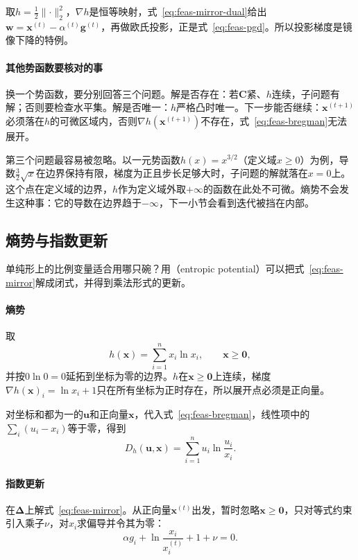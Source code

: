 取$h=\tfrac12\lVert\cdot\rVert_2^2$，$\nabla h$是恒等映射，式~\eqref{eq:feas-mirror-dual}给出$\bm{w}=\bm{x}^{(t)}-\alpha^{(t)}\bm{g}^{(t)}$，再做欧氏投影，正是式~\eqref{eq:feas-pgd}。所以投影梯度是镜像下降的特例。

\paragraph{其他势函数要核对的事}
换一个势函数，要分别回答三个问题。解是否存在：若$\bm{C}$紧、$h$连续，子问题有解；否则要检查水平集。解是否唯一：$h$严格凸时唯一。下一步能否继续：$\bm{x}^{(t+1)}$必须落在$h$的可微区域内，否则$\nabla h(\bm{x}^{(t+1)})$不存在，式~\eqref{eq:feas-bregman}无法展开。

第三个问题最容易被忽略。以一元势函数$h(x)=x^{3/2}$（定义域$x\geq0$）为例，导数$\tfrac32\sqrt{x}$在边界保持有限，梯度为正且步长足够大时，子问题的解就落在$x=0$上。这个点在定义域的边界，$h$作为定义域外取$+\infty$的函数在此处不可微。熵势不会发生这种事：它的导数在边界趋于$-\infty$，下一小节会看到迭代被挡在内部。

\subsection{熵势与指数更新}
\label{sec:feas-entropy}

单纯形上的比例变量适合用哪只碗？用（entropic potential）可以把式~\eqref{eq:feas-mirror}解成闭式，并得到乘法形式的更新。

\paragraph{熵势}
取
\begin{equation}
 h(\bm{x})=\sum_{i=1}^nx_i\ln x_i,\qquad\bm{x}\geq\bm{0},
 \label{eq:feas-entropy}
\end{equation}
并按$0\ln0=0$延拓到坐标为零的边界。$h$在$\bm{x}\geq\bm{0}$上连续，梯度$\nabla h(\bm{x})_i=\ln x_i+1$只在所有坐标为正时存在，所以展开点必须是正向量。

对坐标和都为一的$\bm{u}$和正向量$\bm{x}$，代入式~\eqref{eq:feas-bregman}，线性项中的$\sum_i(u_i-x_i)$等于零，得到
\begin{equation}
 D_h(\bm{u},\bm{x})=\sum_{i=1}^nu_i\ln\frac{u_i}{x_i}.
 \label{eq:feas-kl}
\end{equation}

\paragraph{指数更新}
在$\bm{\Delta}$上解式~\eqref{eq:feas-mirror}。从正向量$\bm{x}^{(t)}$出发，暂时忽略$\bm{x}\geq\bm{0}$，只对等式约束引入乘子$\nu$，对$x_i$求偏导并令其为零：
\[
 \alpha g_i+\ln\frac{x_i}{x_i^{(t)}}+1+\nu=0.
\]

